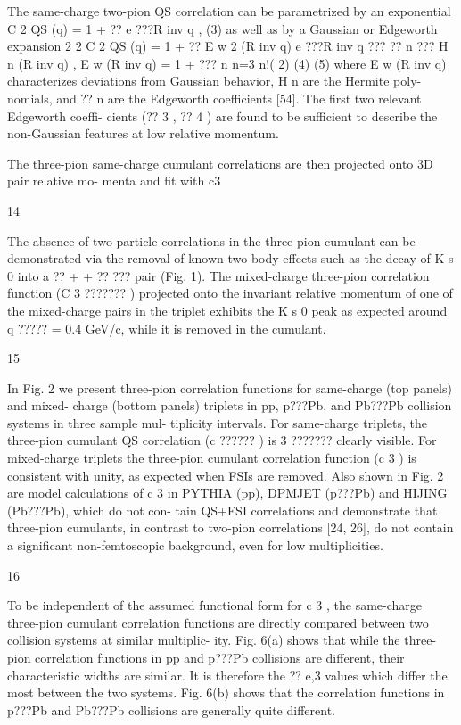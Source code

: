 The same-charge two-pion QS correlation can be parametrized by an exponential
C 2 QS (q) = 1 + ?? e ???R inv q ,
(3)
as well as by a Gaussian or Edgeworth expansion
2
2
C 2 QS (q) = 1 + ?? E w 2 (R inv q) e ???R inv q
???
?? n
??? H n (R inv q) ,
E w (R inv q) = 1 + ???
n
n=3 n!( 2)
(4)
(5)
where E w (R inv q) characterizes deviations from Gaussian behavior, H n are the Hermite poly-
nomials, and ?? n are the Edgeworth coefficients [54]. The first two relevant Edgeworth coeffi-
cients (?? 3 , ?? 4 ) are found to be sufficient to describe the non-Gaussian features at low relative
momentum.

The three-pion same-charge cumulant correlations are then projected onto 3D pair relative mo-
menta and fit with
c3

14

The absence of two-particle correlations in the three-pion cumulant can be demonstrated via
the removal of known two-body effects such as the decay of K s 0 into a ?? + + ?? ??? pair (Fig. 1).
The mixed-charge three-pion correlation function (C 3 ??????? ) projected onto the invariant relative momentum of one of the mixed-charge pairs in the triplet exhibits the K s 0 peak as expected
around q ????? = 0.4 GeV/c, while it is removed in the cumulant.

15

In Fig. 2 we present three-pion correlation functions for same-charge (top panels) and mixed-
charge (bottom panels) triplets in pp, p???Pb, and Pb???Pb collision systems in three sample mul-
tiplicity intervals. For same-charge triplets, the three-pion cumulant QS correlation (c ??????
) is
3
???????
clearly visible. For mixed-charge triplets the three-pion cumulant correlation function (c 3 ) is
consistent with unity, as expected when FSIs are removed.
Also shown in Fig. 2 are model
calculations of c 3 in PYTHIA (pp), DPMJET (p???Pb) and HIJING (Pb???Pb), which do not con-
tain QS+FSI correlations and demonstrate that three-pion cumulants, in contrast to two-pion
correlations [24, 26], do not contain a significant non-femtoscopic background, even for low
multiplicities.

16

To be independent of the assumed functional form for c 3 , the same-charge three-pion cumulant
correlation functions are directly compared between two collision systems at similar multiplic-
ity. Fig. 6(a) shows that while the three-pion correlation functions in pp and p???Pb collisions
are different, their characteristic widths are similar. It is therefore the ?? e,3 values which differ
the most between the two systems. Fig. 6(b) shows that the correlation functions in p???Pb and
Pb???Pb collisions are generally quite different.

